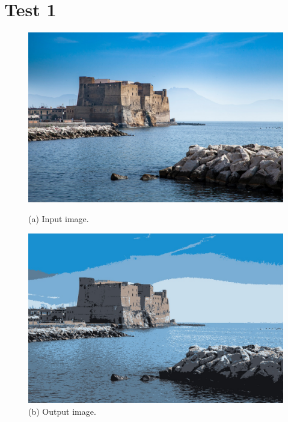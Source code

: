 \section{Test 1}
\begin{figure}[H]
    \centering
    \begin{minipage}[b]{0.45\textwidth}
        \centering
        \includegraphics[width=\textwidth]{images/input_image_t1.jpg}
        \caption{(a) Input image.}
        \label{fig:test_1_input}
    \end{minipage}
    \hfill
    \begin{minipage}[b]{0.45\textwidth}
        \centering
        \includegraphics[width=\textwidth]{images/output_image_t1.jpg}
        \caption{(b) Output image.}
        \label{fig:test_1_output}
    \end{minipage}
    \end{figure}
    
